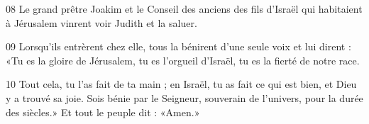 
08 Le grand prêtre Joakim et le Conseil des anciens des fils d'Israël qui habitaient à Jérusalem vinrent voir Judith et la saluer.

09 Lorsqu'ils entrèrent chez elle, tous la bénirent d'une seule voix et lui dirent : «Tu es la gloire de Jérusalem, tu es l'orgueil d'Israël, tu es la fierté de notre race.

10 Tout cela, tu l'as fait de ta main ; en Israël, tu as fait ce qui est bien, et Dieu y a trouvé sa joie. Sois bénie par le Seigneur, souverain de l'univers, pour la durée des siècles.» Et tout le peuple dit : «Amen.»
